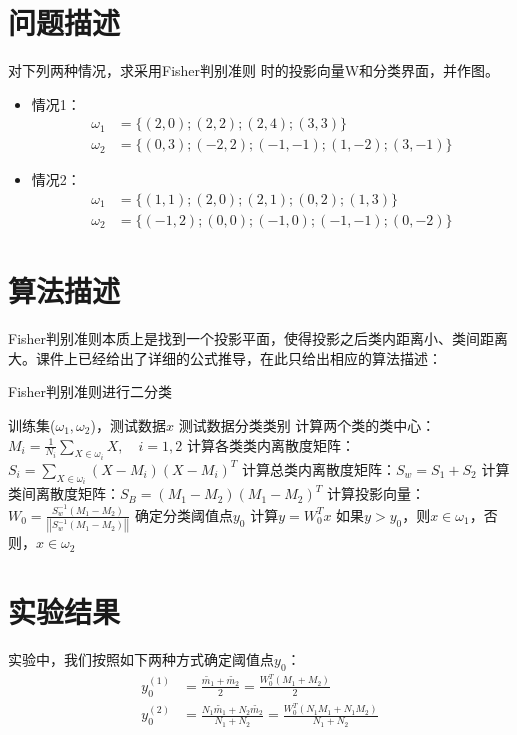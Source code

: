 \documentclass[cn]{elegantbook}
\begin{document}
\section{问题描述}
\noindent 对下列两种情况，求采用Fisher判别准则 时的投影向量W和分类界面，并作图。
\begin{itemize}
	\item 情况1：
	\begin{equation}
	\begin{aligned}
	\omega_1&=\{(2,0); (2,2); (2,4); (3,3)\} \\
	\omega_2&=\{(0,3); (-2,2); (-1,-1); (1,-2); (3,-1)\}
	\end{aligned}
	\end{equation}
	\item 情况2：
	\begin{equation}
	\begin{aligned}
	\omega_1&=\{(1,1); (2,0); (2,1); (0,2); (1,3)\} \\
	\omega_2&=\{(-1,2); (0,0); (-1,0); (-1,-1); (0,-2)\}
	\end{aligned}
	\end{equation}
\end{itemize}

\section{算法描述}
Fisher判别准则本质上是找到一个投影平面，使得投影之后类内距离小、类间距离大。课件上已经给出了详细的公式推导，在此只给出相应的算法描述：

\begin{algorithm}[htb]
	\caption{Fisher判别准则进行二分类}
	\label{alg:fisher}
	\begin{algorithmic}[1]
		\Require 训练集($\omega_1,\omega_2$)，测试数据$x$
		\Ensure 测试数据分类类别
		\State 计算两个类的类中心：$M_i=\frac{1}{N_i}\sum_{X\in \omega_i}X,\quad i=1,2$
		\State 计算各类类内离散度矩阵：$S_i=\sum_{X\in \omega_i}(X-M_i)(X-M_i)^T$
		\State 计算总类内离散度矩阵：$S_w=S_1+S_2$
		\State 计算类间离散度矩阵：$S_B=(M_1-M_2)(M_1-M_2)^T$
		\State 计算投影向量：$W_0=\frac{S_w^{-1}(M_1-M_2)}{\left||S_w^{-1}(M_1-M_2)|\right|}$
		\State 确定分类阈值点$y_0$
		\State 计算$y=W_0^Tx$
		\State 如果$y>y_0$，则$x\in\omega_1$，否则，$x\in\omega_2$
	\end{algorithmic}
\end{algorithm}

\section{实验结果}
实验中，我们按照如下两种方式确定阈值点$y_0$：
\begin{equation}
\begin{aligned}
y_0^{(1)}&=\frac{\tilde{m_1}+\tilde{m_2}}{2}=\frac{W_0^T(M_1+M_2)}{2} \\
y_0^{(2)}&=\frac{N_1\tilde{m_1}+N_2\tilde{m_2}}{N_1+N_2}=\frac{W_0^T(N_1M_1+N_1M_2)}{N_1+N_2}
\end{aligned}
\end{equation}
\end{document}
